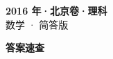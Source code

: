 \documentclass[zihao=-4, a4paper]{ctexart}
\begin{document}
\begin{center}
  {\Large\bfseries 2016 年·北京卷·理科}\\[4pt]
  {\large 数学 · 简答版}
\end{center}
\medskip
{}

\clearpage
{}
\begin{center}{\Large\bfseries 答案速查}\end{center}
\medskip

\end{document}
